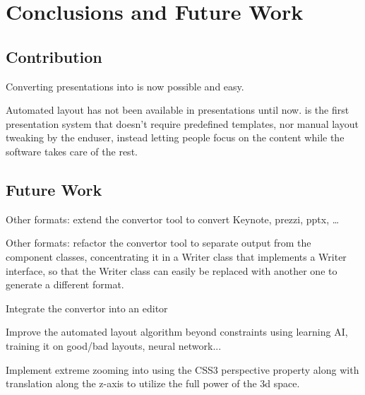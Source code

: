 
 \chapter{Conclusions and Future Work}


  \section{Contribution}


   Converting \ppt presentations into \mxp is now possible and easy.

   Automated layout has not been available in presentations until now. \mxp is
   the first presentation system that doesn't require predefined templates, nor
   manual layout tweaking by the enduser, instead letting people focus on the
   content while the software takes care of the rest.

  \section{Future Work}


   Other formats: extend the convertor tool to convert Keynote, prezzi, pptx,
   \ldots

   Other formats: refactor the convertor tool to separate output from the
   component classes, concentrating it in a Writer class that implements a
   Writer interface, so that the Writer class can easily be replaced with
   another one to generate a different format.

   Integrate the convertor into an \mxp editor

   Improve the automated layout algorithm beyond constraints using learning AI,
   training it on good/bad layouts, neural network...

   Implement extreme zooming into \mxp using the CSS3 perspective property
   along with translation along the z-axis to utilize the full power of the 3d
   space.

